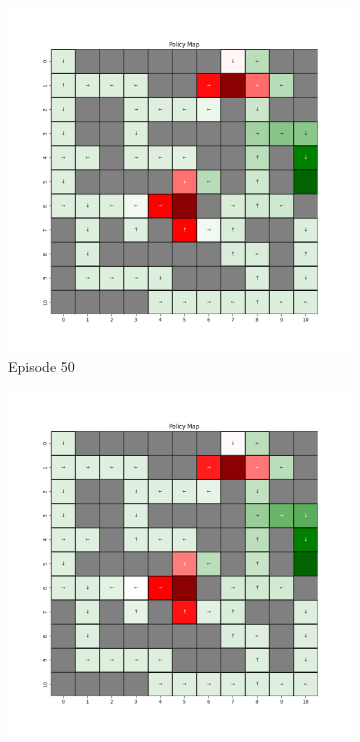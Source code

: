 \documentclass{assignment}
\begin{document}
\begin{figure}[H]
\begin{subfigure}{0.3\textwidth}
        \includegraphics[width=\textwidth]{figures/policy_td/gamma_sweep/policy_alpha_0.1_gamma_0.75_epsilon_0.2_iteration_50.png}
    \caption{Episode 50}
    \end{subfigure}\hfill
    \begin{subfigure}{0.3\textwidth}
        \includegraphics[width=\textwidth]{figures/policy_td/gamma_sweep/policy_alpha_0.1_gamma_0.75_epsilon_0.2_iteration_100.png}

\end{subfigure}
\end{figure}
\end{document}

